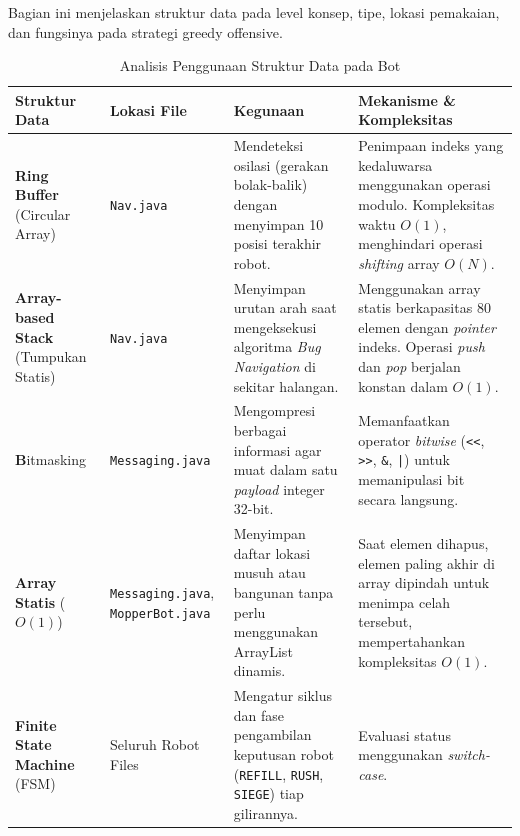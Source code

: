 Bagian ini menjelaskan struktur data pada level konsep, tipe, lokasi pemakaian, dan fungsinya pada strategi greedy offensive.
\begin{table}[htbp]
	\centering
	\renewcommand{\arraystretch}{1.5} %
	\begin{tabular}{|p{3.5cm}|p{3.5cm}|p{4cm}|p{4cm}|}
		\hline
		\textbf{Struktur Data}                                & \textbf{Lokasi File}                             & \textbf{Kegunaan}                                                                                                      & \textbf{Mekanisme \& Kompleksitas}                                                                                                                    \\
		\hline
		\textbf{Ring Buffer} \newline (Circular Array)        & \texttt{Nav.java}                                & Mendeteksi osilasi (gerakan bolak-balik) dengan menyimpan 10 posisi terakhir robot.                                    & Penimpaan indeks yang kedaluwarsa menggunakan operasi modulo. Kompleksitas waktu $O(1)$, menghindari operasi \textit{shifting} array $O(N)$.          \\
		\hline
		\textbf{Array-based Stack} \newline (Tumpukan Statis) & \texttt{Nav.java}                                & Menyimpan urutan arah saat mengeksekusi algoritma \textit{Bug Navigation} di sekitar halangan.                         & Menggunakan array statis berkapasitas 80 elemen dengan \textit{pointer} indeks. Operasi \textit{push} dan \textit{pop} berjalan konstan dalam $O(1)$. \\
		\hline
		\textbf Bitmasking                                    & \texttt{Messaging.java}                          & Mengompresi berbagai informasi agar muat dalam satu \textit{payload} integer 32-bit.                                   & Memanfaatkan operator \textit{bitwise} (\texttt{<<}, \texttt{>>}, \texttt{\&}, \texttt{|}) untuk memanipulasi bit secara langsung.                    \\
		\hline
		\textbf{Array Statis} ($O(1)$)                        & \texttt{Messaging.java}, \texttt{MopperBot.java} & Menyimpan daftar lokasi musuh atau bangunan tanpa perlu menggunakan ArrayList dinamis.                                 & Saat elemen dihapus, elemen paling akhir di array dipindah untuk menimpa celah tersebut, mempertahankan kompleksitas $O(1)$.                          \\
		\hline
		\textbf{Finite State Machine} \newline (FSM)          & Seluruh Robot Files                              & Mengatur siklus dan fase pengambilan keputusan robot (\texttt{REFILL}, \texttt{RUSH}, \texttt{SIEGE}) tiap gilirannya. & Evaluasi status menggunakan \textit{switch-case}.                                                                                                     \\
		\hline
	\end{tabular}
	\caption{Analisis Penggunaan Struktur Data pada Bot}
\end{table}

